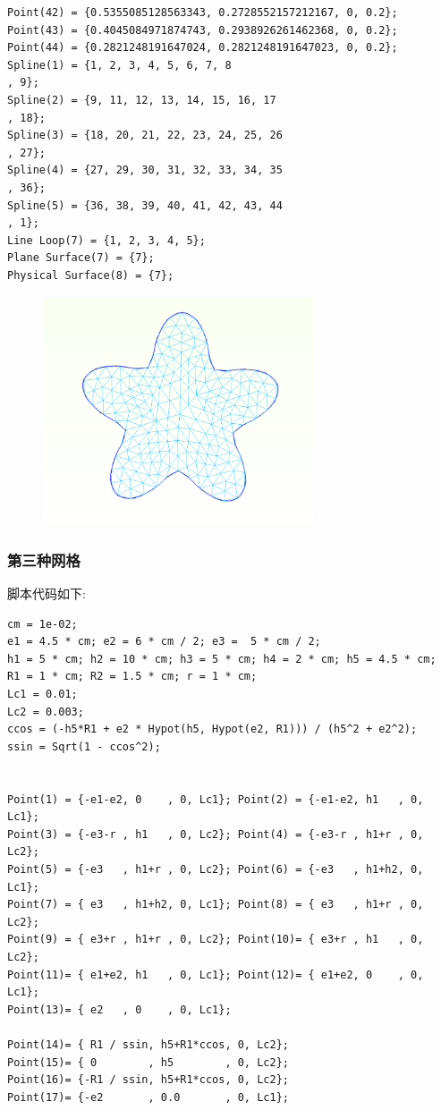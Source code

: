 \documentclass[12pt]{article}
\begin{document}
\begin{CJK}{UTF8}{gkai}
\begin{verbatim}
Point(42) = {0.5355085128563343, 0.2728552157212167, 0, 0.2};
Point(43) = {0.4045084971874743, 0.2938926261462368, 0, 0.2};
Point(44) = {0.2821248191647024, 0.2821248191647023, 0, 0.2};
Spline(1) = {1, 2, 3, 4, 5, 6, 7, 8
, 9};
Spline(2) = {9, 11, 12, 13, 14, 15, 16, 17
, 18};
Spline(3) = {18, 20, 21, 22, 23, 24, 25, 26
, 27};
Spline(4) = {27, 29, 30, 31, 32, 33, 34, 35
, 36};
Spline(5) = {36, 38, 39, 40, 41, 42, 43, 44
, 1};
Line Loop(7) = {1, 2, 3, 4, 5};
Plane Surface(7) = {7};
Physical Surface(8) = {7};
\end{verbatim}
\begin{figure}[H]
	\centering
	\includegraphics[width=8cm]{huaban.png}
	\caption{}  		
\end{figure}
\subsubsection{第三种网格}
脚本代码如下:\\
\begin{verbatim}
cm = 1e-02;
e1 = 4.5 * cm; e2 = 6 * cm / 2; e3 =  5 * cm / 2;
h1 = 5 * cm; h2 = 10 * cm; h3 = 5 * cm; h4 = 2 * cm; h5 = 4.5 * cm;
R1 = 1 * cm; R2 = 1.5 * cm; r = 1 * cm;
Lc1 = 0.01;
Lc2 = 0.003;
ccos = (-h5*R1 + e2 * Hypot(h5, Hypot(e2, R1))) / (h5^2 + e2^2);
ssin = Sqrt(1 - ccos^2);


Point(1) = {-e1-e2, 0    , 0, Lc1}; Point(2) = {-e1-e2, h1   , 0, Lc1};
Point(3) = {-e3-r , h1   , 0, Lc2}; Point(4) = {-e3-r , h1+r , 0, Lc2};
Point(5) = {-e3   , h1+r , 0, Lc2}; Point(6) = {-e3   , h1+h2, 0, Lc1};
Point(7) = { e3   , h1+h2, 0, Lc1}; Point(8) = { e3   , h1+r , 0, Lc2};
Point(9) = { e3+r , h1+r , 0, Lc2}; Point(10)= { e3+r , h1   , 0, Lc2};
Point(11)= { e1+e2, h1   , 0, Lc1}; Point(12)= { e1+e2, 0    , 0, Lc1};
Point(13)= { e2   , 0    , 0, Lc1};

Point(14)= { R1 / ssin, h5+R1*ccos, 0, Lc2};
Point(15)= { 0        , h5        , 0, Lc2};
Point(16)= {-R1 / ssin, h5+R1*ccos, 0, Lc2};
Point(17)= {-e2       , 0.0       , 0, Lc1};


\end{verbatim}
\end{CJK}
\end{document}
